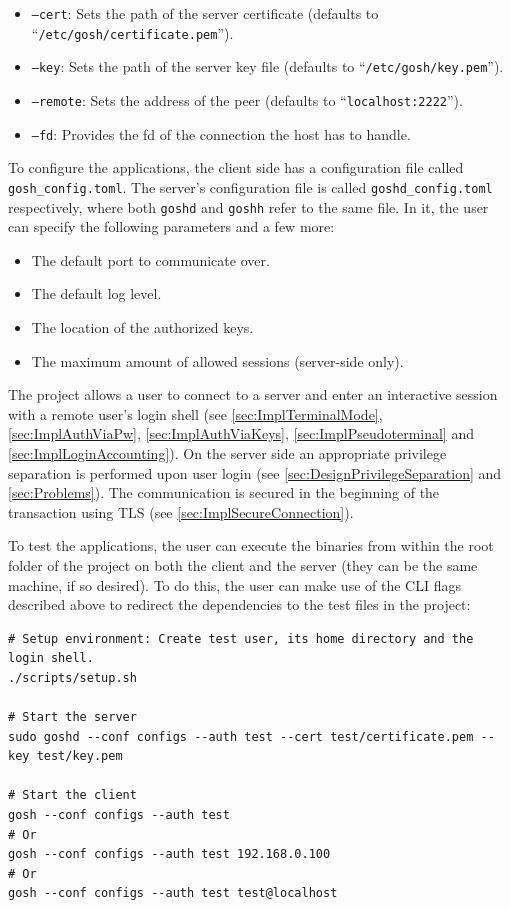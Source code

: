 \documentclass[10pt,a4paper,titlepage,twoside,english,final]{zhawreprt}
\begin{document}
\begin{itemize}
\begin{itemize}
\item \texttt{--cert}: Sets the path of the server certificate (defaults to ``\texttt{/etc/gosh/certifi\linebreak{}cate.pem}'').
\item \texttt{--key}: Sets the path of the server key file (defaults to ``\texttt{/etc/gosh/key.pem}'').
\item \texttt{--remote}: Sets the address of the peer (defaults to ``\texttt{localhost:2222}'').
\item \texttt{--fd}: Provides the \gls{fd} of the connection the host has to handle.
\end{itemize}
\end{itemize}

To configure the applications, the client side has a configuration file called \texttt{gosh\_config.toml}.
The server's configuration file is called \texttt{goshd\_config.toml} respectively, where both \texttt{goshd} and \texttt{goshh} refer to the same file.
In it, the user can specify the following parameters and a few more:
\begin{itemize}
\item The default port to communicate over.
\item The default log level.
\item The location of the authorized keys.
\item The maximum amount of allowed sessions (server-side only).
\end{itemize}

The project allows a user to connect to a server and enter an interactive session with a remote user's \gls{login} \gls{shell} (see \ref{sec:ImplTerminalMode}, \ref{sec:ImplAuthViaPw}, \ref{sec:ImplAuthViaKeys}, \ref{sec:ImplPseudoterminal} and \ref{sec:ImplLoginAccounting}).
On the server side an appropriate privilege separation is performed upon user \gls{login} (see \ref{sec:DesignPrivilegeSeparation} and \ref{sec:Problems}).
The communication is secured in the beginning of the transaction using \gls{TLS} (see \ref{sec:ImplSecureConnection}).

To test the applications, the user can execute the binaries from within the root folder of the project on both the client and the server (they can be the same machine, if so desired).
To do this, the user can make use of the \gls{CLI} flags described above to redirect the dependencies to the test files in the project:
\setlistingBash
\begin{lstlisting}[caption={Running the applications for test purposes},label=lst:RunProject]
# Setup environment: Create test user, its home directory and the login shell.
./scripts/setup.sh

# Start the server
sudo goshd --conf configs --auth test --cert test/certificate.pem --key test/key.pem

# Start the client
gosh --conf configs --auth test
# Or
gosh --conf configs --auth test 192.168.0.100
# Or
gosh --conf configs --auth test test@localhost
\end{lstlisting}
\end{document}
